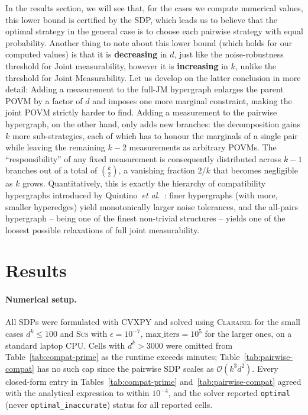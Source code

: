 \documentclass[oneside, a4paper, onecolumn, 11pt]{article}
\theoremstyle{definition}
\theoremstyle{plain}
\theoremstyle{remark}
\begin{document}
In the results section, we will see that, for the cases we compute numerical values, this lower bound is certified by the SDP, which leads us to 
believe that the optimal strategy in the general case is to choose each pairwise strategy with equal probability.
Another thing to note about this lower bound (which holds for our computed values) is that it is \textbf{decreasing} in $d$, just like the noise-robustness threshold for Joint measurability,
however it is \textbf{increasing} in $k$, unlike the threshold for Joint Measurability.
\newline Let us develop on the latter conclusion in more detail: Adding a
measurement to the full-JM hypergraph enlarges the parent POVM by a
factor of $d$ and imposes one more marginal constraint, making the
joint POVM strictly harder to find. Adding a measurement to the
pairwise hypergraph, on the other hand, only adds new branches: the
decomposition gains $k$ more sub-strategies, each of which has to honour
the marginals of a single pair while leaving the remaining $k-2$
measurements as arbitrary POVMs. The ``responsibility'' of any fixed
measurement is consequently distributed across $k-1$ branches out of a
total of $\binom{k}{2}$, a vanishing fraction $2/k$ that becomes
negligible as $k$ grows. Quantitatively, this is exactly the
hierarchy of compatibility hypergraphs introduced by
Quintino~\emph{et al.}~\cite{Quintino2019}: finer hypergraphs (with
more, smaller hyperedges) yield monotonically larger noise tolerances,
and the all-pairs hypergraph -- being one of the finest non-trivial
structures -- yields one of the loosest possible relaxations of full
joint measurability.



\newpage
\section{Results}\label{sec:results}

\paragraph{Numerical setup.}
All SDPs were formulated with CVXPY and solved using
\textsc{Clarabel} for the small cases $d^k \le 100$ and \textsc{Scs} with
$\epsilon = 10^{-7}$, $\text{max\_iters} = 10^{5}$ for the larger ones,
on a standard laptop CPU. Cells with $d^k > 3000$ were omitted from
Table~\ref{tab:compat-prime} as the runtime exceeds 
minutes; Table~\ref{tab:pairwise-compat} has no such cap since the
pairwise SDP scales as $\mathcal{O}(k^3 d^2)$. Every closed-form entry
in Tables~\ref{tab:compat-prime} and~\ref{tab:pairwise-compat} agreed
with the analytical expression to within $10^{-4}$, and the solver
reported \texttt{optimal} (never \texttt{optimal\_inaccurate}) status
for all reported cells.
\end{document}
